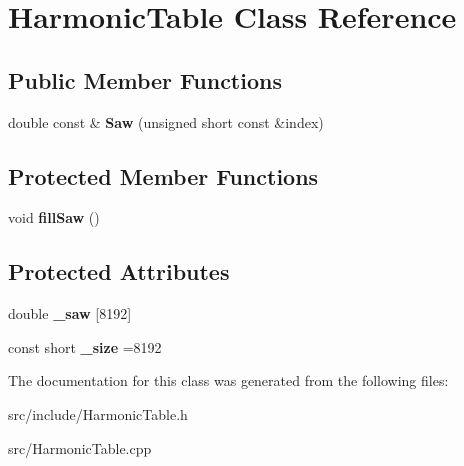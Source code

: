 \hypertarget{class_harmonic_table}{\section{Harmonic\+Table Class Reference}
\label{class_harmonic_table}
}
\subsection*{Public Member Functions}
\begin{DoxyCompactItemize}
\item 
\hypertarget{class_harmonic_table_ac36569d6a4d065c618dcd12ae8cbb2ed}{double const \& {\bfseries Saw} (unsigned short const \&index)}\label{class_harmonic_table_ac36569d6a4d065c618dcd12ae8cbb2ed}

\end{DoxyCompactItemize}
\subsection*{Protected Member Functions}
\begin{DoxyCompactItemize}
\item 
\hypertarget{class_harmonic_table_a50aa74165d2082e8626b236fc64d727c}{void {\bfseries fill\+Saw} ()}\label{class_harmonic_table_a50aa74165d2082e8626b236fc64d727c}

\end{DoxyCompactItemize}
\subsection*{Protected Attributes}
\begin{DoxyCompactItemize}
\item 
\hypertarget{class_harmonic_table_ace9686e62e12a5f273e63d0b01361e17}{double {\bfseries \+\_\+saw} \mbox{[}8192\mbox{]}}\label{class_harmonic_table_ace9686e62e12a5f273e63d0b01361e17}

\item 
\hypertarget{class_harmonic_table_aff4a3f2c24db9cb01029975b64d2ef74}{const short {\bfseries \+\_\+size} =8192}\label{class_harmonic_table_aff4a3f2c24db9cb01029975b64d2ef74}

\end{DoxyCompactItemize}


The documentation for this class was generated from the following files\+:\begin{DoxyCompactItemize}
\item 
src/include/Harmonic\+Table.\+h\item 
src/Harmonic\+Table.\+cpp\end{DoxyCompactItemize}
